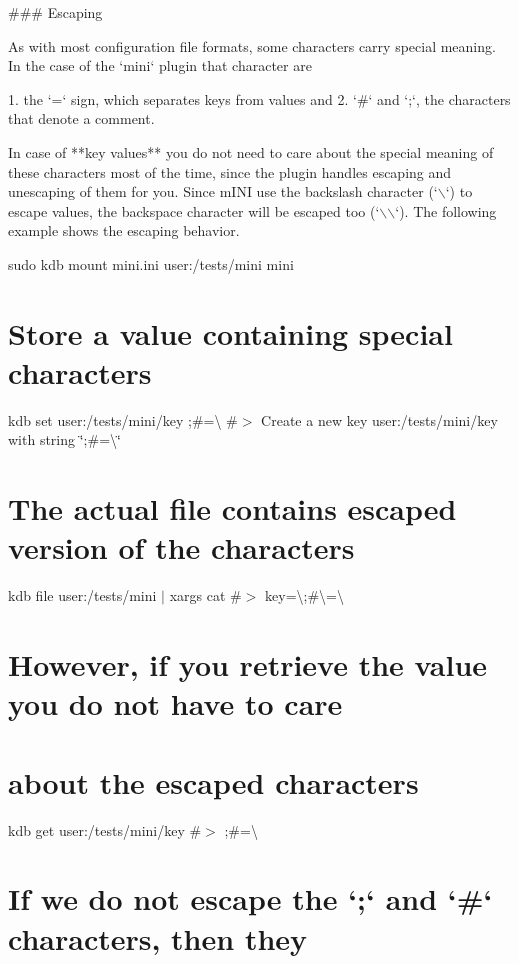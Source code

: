 \begin{DoxyCode}
### Escaping

As with most configuration file formats, some characters carry special meaning. In the case of the `mini`
       plugin that character are

1. the `=` sign, which separates keys from values and
2. `#` and `;`, the characters that denote a comment.

In case of **key values** you do not need to care about the special meaning of these characters most of the
       time, since the plugin handles escaping and unescaping of them for you. Since mINI use the backslash
       character (`\(\backslash\)`) to escape values, the backspace character will be escaped too (`\(\backslash\)\(\backslash\)`). The following example shows
       the escaping behavior.
\end{DoxyCode}
 sudo kdb mount mini.\+ini user\+:/tests/mini mini\hypertarget{autotoc_md377_autotoc_md387}{}\section{Store a value containing special characters}\label{autotoc_md377_autotoc_md387}
kdb set user\+:/tests/mini/key \textquotesingle{};\#=\textbackslash{}\textquotesingle{} \#$>$ Create a new key user\+:/tests/mini/key with string \char`\"{};\#=\textbackslash{}\char`\"{}\hypertarget{autotoc_md377_autotoc_md388}{}\section{The actual file contains escaped version of the characters}\label{autotoc_md377_autotoc_md388}
kdb file user\+:/tests/mini $\vert$ xargs cat \#$>$ key=\textbackslash{};\#\textbackslash{}=\textbackslash{}\hypertarget{autotoc_md377_autotoc_md389}{}\section{However, if you retrieve the value you do not have to care}\label{autotoc_md377_autotoc_md389}
\hypertarget{autotoc_md377_autotoc_md390}{}\section{about the escaped characters}\label{autotoc_md377_autotoc_md390}
kdb get user\+:/tests/mini/key \#$>$ ;\#=\textbackslash{}\hypertarget{autotoc_md377_autotoc_md391}{}\section{If we do not escape the `;` and `\#` characters, then they}\label{autotoc_md377_autotoc_md391}
